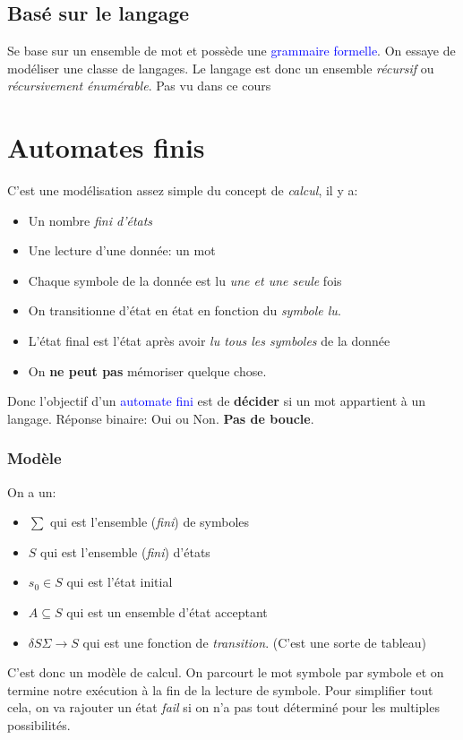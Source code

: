 \documentclass{report}
\begin{document}
\subsection{Basé sur le langage}

Se base sur un ensemble de mot et possède une \textcolor{blue}{grammaire formelle}. On essaye de modéliser une classe de langages. Le langage est donc un ensemble \textit{récursif} ou \textit{récursivement énumérable}. Pas vu dans ce cours

\section{Automates finis}
\noindent
C'est une modélisation assez simple du concept de \textit{calcul}, il y a:
\begin{itemize}
\item Un nombre \textit{fini d'états}
\item Une lecture d'une donnée: un mot
\item Chaque symbole de la donnée est lu \textit{une et une seule} fois
\item On transitionne d'état en état en fonction du \textit{symbole lu}.
\item L'état final est l'état après avoir \textit{lu tous les symboles} de la donnée
\item On \textbf{ne peut pas} mémoriser quelque chose. 
\end{itemize}
Donc l'objectif d'un \textcolor{blue}{automate fini} est de \textbf{décider} si un mot appartient à un langage. Réponse binaire: Oui ou Non. \textbf{Pas de boucle}.
\subsubsection{Modèle}
\noindent
On a un:
\begin{itemize}
\item $\sum$ qui est l'ensemble (\textit{fini}) de symboles
\item $S$ qui est l'ensemble (\textit{fini}) d'états
\item $s_0 \in S$ qui est l'état initial
\item $A \subseteq S$ qui est un ensemble d'état acceptant
\item $ \delta  S  \Sigma \rightarrow S $ qui est une fonction de \textit{transition}. (C'est une sorte de tableau)
\end{itemize}
C'est donc un modèle de calcul. On parcourt le mot symbole par symbole et on termine notre exécution à la fin de la lecture de symbole. Pour simplifier tout cela, on va rajouter un état \textit{fail} si on n'a pas tout déterminé pour les multiples possibilités.\\
\end{document}
